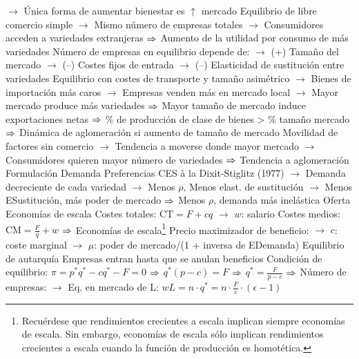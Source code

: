 \documentclass{nuevotema}
\begin{document}
\begin{esquemal}
				\4[] $\to$ Única forma de aumentar bienestar es $\uparrow$ mercado
				\4[] Equilibrio de libre comercio simple
				\4[] $\to$ Mismo número de empresas totales
				\4[] $\to$ Consumidores acceden a variedades extranjeras
				\4[] $\Rightarrow$ Aumento de la utilidad por consumo de más variedades
				\4[] Número de empresas en equilibrio depende de:
				\4[] $\to$ (+) Tamaño del mercado
				\4[] $\to$ (--) Costes fijos de entrada
				\4[] $\to$ (--) Elasticidad de sustitución entre variedades
				\4[] Equilibrio con costes de transporte y tamaño asimétrico
				\4[] $\to$ Bienes de importación más caros
				\4[] $\to$ Empresas venden más en mercado local
				\4[] $\to$ Mayor mercado produce más variedades
				\4[] $\Rightarrow$ Mayor tamaño de mercado induce exportaciones netas
				\4[] $\Rightarrow$ \% de producción de clase de bienes > \% tamaño mercado
				\4[] $\Rightarrow$ Dinámica de aglomeración si aumento de tamaño de mercado
				\4[] Movilidad de factores sin comercio
				\4[] $\to$ Tendencia a moverse donde mayor mercado
				\4[] $\to$ Consumidores quieren mayor número de variedades
				\4[] $\Rightarrow$ Tendencia a aglomeración
			\3 Formulación
				\4 Demanda
				\4[] Preferencias CES à la Dixit-Stiglitz (1977)
				\4[] 
				\4[] $\to$ Demanda decreciente de cada variedad
				\4[] $\to$ Menos $\rho$, Menos elast. de sustitución
				\4[] $\to$ Menos ESustitución, más poder de mercado
				\4[] $\Rightarrow$ Menos $\rho$, demanda más inelástica
				\4 Oferta
				\4[] Economías de escala
				\4[] Costes totales:
				\4[] $\text{CT} = F + cq$
				\4[] $\to$ $w$: salario
				\4[] Costes medios:
				\4[] $\text{CM} = \frac{F}{q} + w$
				\4[] $\Rightarrow$ Economías de escala\footnote{Recuérdese que rendimientos crecientes a escala implican siempre economías de escala. Sin embargo, economías de escala sólo implican rendimientos crecientes a escala cuando la función de producción es homotética.}
				\4[] Precio maximizador de beneficio:
				\4[] 
				\4[] $\to$ $c$: coste marginal
				\4[] $\to$ $\mu$: poder de mercado/(1 + inversa de EDemanda)
				\4 Equilibrio de autarquía
				\4[] Empresas entran hasta que se anulan beneficios
				\4[] Condición de equilibrio:
				\4[] $\pi = p^* q^* - c q^* - F = 0$
				\4[] $\Rightarrow$ $q^* (p-c) = F$ $\Rightarrow$ $q^*=\frac{F}{p-c}$
				\4[] $\Rightarrow$ 
				\4[] Número de empresas:
				\4[] $\to$ Eq. en mercado de L: $wL = n \cdot q^* = n \cdot \frac{F}{c} \cdot (\epsilon -1)$

\end{esquemal}
\end{document}

